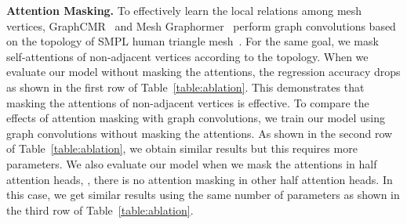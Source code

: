 \noindent \textbf{Attention Masking.}
To effectively learn the local relations among mesh vertices, \mbox{GraphCMR~\cite{kolotouros2019cmr}} and Mesh Graphormer~\cite{lin2021graphormer} perform graph convolutions based on the topology of SMPL human triangle mesh~\cite{SMPL:2015}.
For the same goal,
we mask self-attentions of non-adjacent vertices according to the topology.
When we evaluate our model without masking the attentions,
the regression accuracy drops as shown in the first row of Table~\ref{table:ablation}.
This demonstrates that masking the attentions of non-adjacent vertices is effective.
To compare the effects of attention masking with graph convolutions,
we train our model using graph convolutions without masking the attentions.
As shown in the second row of Table~\ref{table:ablation}, we obtain similar results but this requires more parameters.
We also evaluate our model when we mask the attentions in half attention heads, \ie, there is no attention masking in other half attention heads.
In this case,
we get similar results using the same number of parameters as shown in the third row of Table~\ref{table:ablation}.

\begin{table}[t!]
    \centering
    \caption{
        Ablation study of our FastMETRO on Human3.6M~\cite{wang2014h36m}. 
        The effects of different components are evaluated.
        The default model is FastMETRO-S-R50.
    }
    \label{table:ablation}
\end{table}

